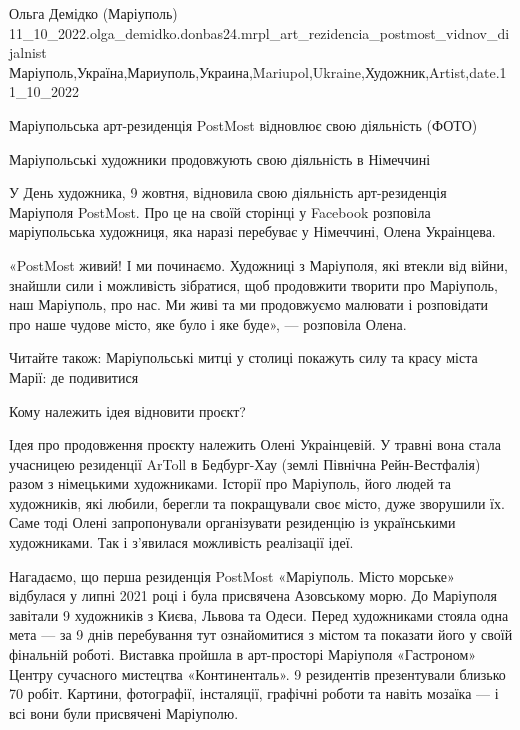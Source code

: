  
 
 
 
 

Ольга Демідко (Маріуполь)
11_10_2022.olga_demidko.donbas24.mrpl_art_rezidencia_postmost_vidnov_dijalnist
Маріуполь,Україна,Мариуполь,Украина,Mariupol,Ukraine,Художник,Artist,date.11_10_2022

Маріупольська арт-резиденція PostMost відновлює свою діяльність (ФОТО)

Маріупольські художники продовжують свою діяльність в Німеччині

У День художника, 9 жовтня, відновила свою діяльність арт-резиденція Маріуполя
PostMost. Про це на своїй сторінці у Facebook розповіла маріупольська
художниця, яка наразі перебуває у Німеччині, Олена Украінцева.

«PostMost живий! І ми починаємо. Художниці з Маріуполя, які втекли від війни,
знайшли сили і можливість зібратися, щоб продовжити творити про Маріуполь, наш
Маріуполь, про нас. Ми живі та ми продовжуємо малювати і розповідати про наше
чудове місто, яке було і яке буде», — розповіла Олена.

Читайте також: Маріупольські митці у столиці покажуть силу та красу міста
Марії: де подивитися

Кому належить ідея відновити проєкт?

Ідея про продовження проєкту належить Олені Украінцевій. У травні вона стала
учасницею резиденції ArToll в Бедбург-Хау (землі Північна Рейн-Вестфалія) разом
з німецькими художниками. Історії про Маріуполь, його людей та художників, які
любили, берегли та покращували своє місто, дуже зворушили їх. Саме тоді Олені
запропонували організувати резиденцію із українськими художниками. Так і
з’явилася можливість реалізації ідеї.

Нагадаємо, що перша резиденція PostMost «Маріуполь. Місто морське» відбулася у
липні 2021 році і була присвячена Азовському морю. До Маріуполя завітали 9
художників з Києва, Львова та Одеси. Перед художниками стояла одна мета — за 9
днів перебування тут ознайомитися з містом та показати його у своїй фінальній
роботі. Виставка пройшла в арт-просторі Маріуполя «Гастроном» Центру сучасного
мистецтва «Континенталь». 9 резидентів презентували близько 70 робіт. Картини,
фотографії, інсталяції, графічні роботи та навіть мозаїка — і всі вони були
присвячені Маріуполю.

